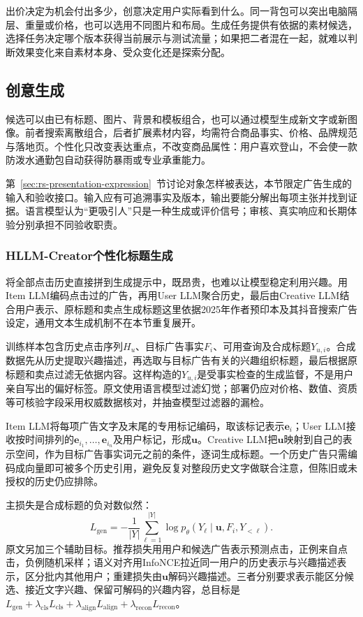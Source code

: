 出价决定为机会付出多少，创意决定用户实际看到什么。同一背包可以突出电脑隔层、重量或价格，也可以选用不同图片和布局。生成任务提供有依据的素材候选，选择任务决定哪个版本获得当前展示与测试流量；如果把二者混在一起，就难以判断效果变化来自素材本身、受众变化还是探索分配。

\subsection{创意生成}
\label{sec:rs-advertising-creative-generation}

候选可以由已有标题、图片、背景和模板组合，也可以通过模型生成新文字或新图像。前者搜索离散组合，后者扩展素材内容，均需符合商品事实、价格、品牌规范与落地页。个性化只改变表达重点，不改变商品属性：用户喜欢登山，不会使一款防泼水通勤包自动获得防暴雨或专业承重能力。

第~\ref{sec:rs-presentation-expression}~节讨论对象怎样被表达，本节限定广告生成的输入和验收接口。输入应有可追溯事实及版本，输出要能分解出每项主张并找到证据。语言模型认为“更吸引人”只是一种生成或评价信号；审核、真实响应和长期体验分别承担不同验收职责。

\subsubsection{HLLM-Creator个性化标题生成}
\label{sec:rs-advertising-hllm-creator}

将全部点击历史直接拼到生成提示中，既昂贵，也难以让模型稳定利用兴趣。用Item LLM编码点击过的广告，再用User LLM聚合历史，最后由Creative LLM结合用户表示、原标题和卖点生成标题这里依据2025年作者预印本及其抖音搜索广告设定，通用文本生成机制不在本节重复展开。

训练样本包含历史点击序列$H_u$、目标广告事实$F_i$、可用查询及合成标题$Y_{u,i}$。合成数据先从历史提取兴趣描述，再选取与目标广告有关的兴趣组织标题，最后根据原标题和卖点过滤无依据内容。这样构造的$Y_{u,i}$是受事实检查的生成监督，不是用户亲自写出的偏好标签。原文使用语言模型过滤幻觉；部署仍应对价格、数值、资质等可核验字段采用权威数据核对，并抽查模型过滤器的漏检。

Item LLM将每项广告文字及末尾的专用标记编码，取该标记表示$\bm{e}_i$；User LLM接收按时间排列的$\bm{e}_{i_1},\ldots,\bm{e}_{i_n}$及用户标记，形成$\bm{u}$。Creative LLM把$\bm{u}$映射到自己的表示空间，作为目标广告事实词元之前的条件，逐词生成标题。一个历史广告只需编码成向量即可被多个历史引用，避免反复对整段历史文字做联合注意，但陈旧或未授权的历史仍应排除。

主损失是合成标题的负对数似然：
\[
  L_{\mathrm{gen}}
    =-\frac{1}{|Y|}\sum_{\ell=1}^{|Y|}
       \log p_\theta(Y_\ell\mid\bm{u},F_i,Y_{<\ell}).
\]
原文另加三个辅助目标。推荐损失用用户和候选广告表示预测点击，正例来自点击，负例随机采样；语义对齐用InfoNCE拉近同一用户的历史表示与兴趣描述表示，区分批内其他用户；重建损失由$\bm{u}$解码兴趣描述。三者分别要求表示能区分候选、接近文字兴趣、保留可解码的兴趣内容，总目标是$L_{\mathrm{gen}}+\lambda_{\mathrm{cls}}L_{\mathrm{cls}}+\lambda_{\mathrm{align}}L_{\mathrm{align}}+\lambda_{\mathrm{recon}}L_{\mathrm{recon}}$。

